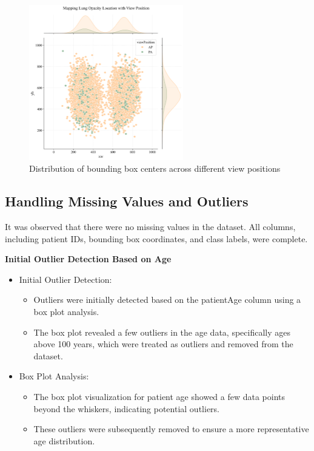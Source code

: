 \begin{figure}[H]
    \begin{center}
        \includegraphics[width = 0.6\textwidth]{figures/Figure19.png}
        \caption{Distribution of bounding box centers across different view positions}
        \label{fig:cha-2 figure14}
    \end{center}
\end{figure}


\subsection{Handling Missing Values and Outliers}
\label{subsec:chap2 section 1.5}

It was observed that there were no missing values in the dataset. All columns, including patient IDs, bounding box coordinates, and class labels, were complete.

\textbf{Initial Outlier Detection Based on Age}
\begin{itemize}
    \item Initial Outlier Detection:
          \begin{itemize}
              \item Outliers were initially detected based on the patientAge column using a box plot analysis.
              \item The box plot revealed a few outliers in the age data, specifically ages above 100 years, which were treated as outliers and removed from the dataset.
          \end{itemize}
    \item Box Plot Analysis:
          \begin{itemize}
              \item The box plot visualization for patient age showed a few data points beyond the whiskers, indicating potential outliers.
              \item These outliers were subsequently removed to ensure a more representative age distribution.
          \end{itemize}
\end{itemize}

